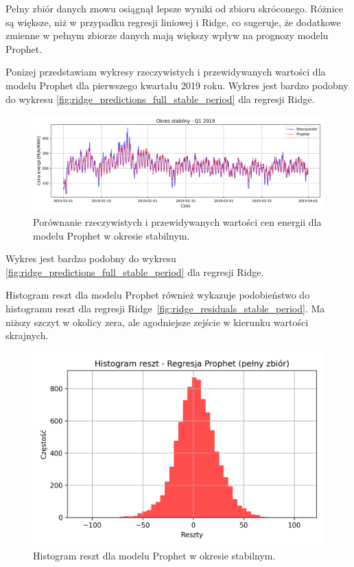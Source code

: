 Pełny zbiór danych znowu osiągnął lepsze wyniki od zbioru skróconego. Różnice są większe, niż w przypadku regresji liniowej i Ridge, co sugeruje, że dodatkowe zmienne w pełnym zbiorze danych mają większy wpływ na prognozy modelu Prophet.

Ponizej przedstawiam wykresy rzeczywistych i przewidywanych wartości dla modelu Prophet dla pierwszego kwartału 2019 roku. Wykres jest bardzo podobny do wykresu \ref{fig:ridge_predictions_full_stable_period} dla regresji Ridge.

\begin{figure}[H]
    \centering
    \includegraphics[width=1.0\textwidth]{../../plots/predicts/Prophet_predictions_stable_Q1.png}
    \caption{Porównanie rzeczywistych i przewidywanych wartości cen energii dla modelu Prophet w okresie stabilnym.}
    \label{fig:prophet_predictions_stable_period}
\end{figure}

Wykres jest bardzo podobny do wykresu \ref{fig:ridge_predictions_full_stable_period} dla regresji Ridge. 

Histogram reszt dla modelu Prophet również wykazuje podobieństwo do histogramu reszt dla regresji Ridge~\ref{fig:ridge_residuals_stable_period}. Ma niższy szczyt w okolicy zera, ale agodniejsze zejście w kierunku wartości skrajnych. 

\begin{figure}[H]
    \centering
    \includegraphics[width=1.0\textwidth]{../../plots/predicts/residuals_histogram_Prophet_full_stable_period_comb_1.png}
    \caption{Histogram reszt dla modelu Prophet w okresie stabilnym.}
    \label{fig:prophet_residuals_stable}
\end{figure}

